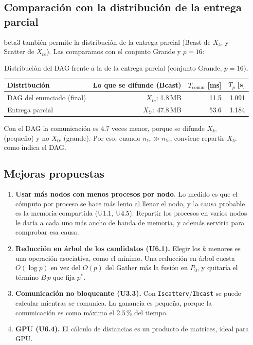 \documentclass[11pt,a4paper]{article}
\newcommand{\ntr}{n_{tr}}
\newcommand{\nte}{n_{te}}
\newcommand{\tsub}[1]{T_{\mathrm{#1}}}
\begin{document}
\subsection{Comparación con la distribución de la entrega parcial}\label{sec:variantes}
beta3 también permite la distribución de la entrega parcial (Bcast de $X_{tr}$ y Scatter de $X_{te}$). Las comparamos con el conjunto Grande y $p=16$:

\begin{table}[htbp]
\centering\small
\caption{Distribución del DAG frente a la de la entrega parcial (conjunto Grande, $p=16$).}\label{tab:var}
\begin{tabular}{@{}lrrr@{}}\toprule
Distribución & Lo que se difunde (Bcast) & $\tsub{comm}$ [ms] & $T_p$ [s]\\\midrule
DAG del enunciado (final) & $X_{te}$: 1.8\,MB & 11.5 & 1.091\\
Entrega parcial & $X_{tr}$: 47.8\,MB & 53.6 & 1.184\\\bottomrule
\end{tabular}
\end{table}

Con el DAG la comunicación es 4.7 veces menor, porque se difunde $X_{te}$ (pequeño) y no $X_{tr}$ (grande). Por eso, cuando $\ntr\gg\nte$, conviene repartir $X_{tr}$ como indica el DAG.

\subsection{Mejoras propuestas}\label{sec:mejoras}
\begin{enumerate}
\item \textbf{Usar más nodos con menos procesos por nodo.} Lo medido es que el cómputo por proceso se hace más lento al llenar el nodo, y la causa probable es la memoria compartida (U1.1, U4.5). Repartir los procesos en varios nodos le daría a cada uno más ancho de banda de memoria, y además serviría para comprobar esa causa.
\item \textbf{Reducción en árbol de los candidatos (U6.1).} Elegir los $k$ menores es una operación asociativa, como el mínimo. Una reducción en árbol cuesta $O(\log p)$ en vez del $O(p)$ del Gather más la fusión en $P_0$, y quitaría el término $B\,p$ que fija $p^*$.
\item \textbf{Comunicación no bloqueante (U3.3).} Con \texttt{Iscatterv}/\texttt{Ibcast} se puede calcular mientras se comunica. La ganancia es pequeña, porque la comunicación es como máximo el 2.5\,\% del tiempo.
\item \textbf{GPU (U6.4).} El cálculo de distancias es un producto de matrices, ideal para GPU.
\end{enumerate}
\end{document}
